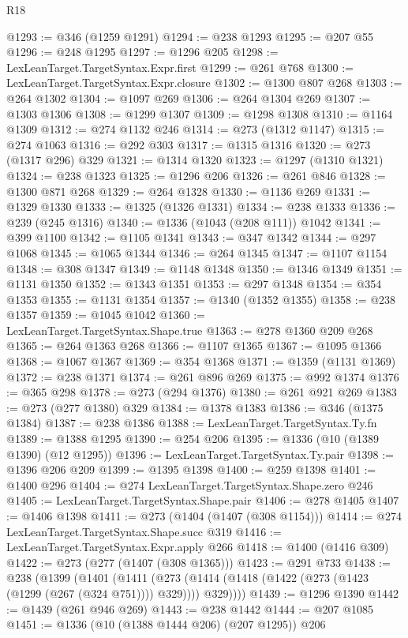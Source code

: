 \begin{lexlean}{R18}
\begin{coremodule}
{{{{{{{{{{{{{{{{{{{{{{{{{{{{{{{{{{{{{{{{{{{{{{{{{{{{{{{{{{{{{{{{{{{{{{{{{{{{{{{{{{{{{{{{{{{{{{{{{{{{{{{{{{{{{{{{{{{{{{{{{{{{{{{{{{{{{{{{{{{{{{{@1293 := @346 (@1259 @1291)
@1294 := @238 @1293
@1295 := @207 @55
@1296 := @248 @1295
@1297 := @1296 @205
@1298 := LexLeanTarget.TargetSyntax.Expr.first
@1299 := @261 @768
@1300 := LexLeanTarget.TargetSyntax.Expr.closure
@1302 := @1300 @807 @268
@1303 := @264 @1302
@1304 := @1097 @269
@1306 := @264 @1304 @269
@1307 := @1303 @1306
@1308 := @1299 @1307
@1309 := @1298 @1308
@1310 := @1164 @1309
@1312 := @274 @1132 @246
@1314 := @273 (@1312 @1147)
@1315 := @274 @1063
@1316 := @292 @303
@1317 := @1315 @1316
@1320 := @273 (@1317 @296) @329
@1321 := @1314 @1320
@1323 := @1297 (@1310 @1321)
@1324 := @238 @1323
@1325 := @1296 @206
@1326 := @261 @846
@1328 := @1300 @871 @268
@1329 := @264 @1328
@1330 := @1136 @269
@1331 := @1329 @1330
@1333 := @1325 (@1326 @1331)
@1334 := @238 @1333
@1336 := @239 (@245 @1316)
@1340 := @1336 (@1043 (@208 @111)) @1042
@1341 := @399 @1100
@1342 := @1105 @1341
@1343 := @347 @1342
@1344 := @297 @1068
@1345 := @1065 @1344
@1346 := @264 @1345
@1347 := @1107 @1154
@1348 := @308 @1347
@1349 := @1148 @1348
@1350 := @1346 @1349
@1351 := @1131 @1350
@1352 := @1343 @1351
@1353 := @297 @1348
@1354 := @354 @1353
@1355 := @1131 @1354
@1357 := @1340 (@1352 @1355)
@1358 := @238 @1357
@1359 := @1045 @1042
@1360 := LexLeanTarget.TargetSyntax.Shape.true
@1363 := @278 @1360 @209 @268
@1365 := @264 @1363 @268
@1366 := @1107 @1365
@1367 := @1095 @1366
@1368 := @1067 @1367
@1369 := @354 @1368
@1371 := @1359 (@1131 @1369)
@1372 := @238 @1371
@1374 := @261 @896 @269
@1375 := @992 @1374
@1376 := @365 @298
@1378 := @273 (@294 @1376)
@1380 := @261 @921 @269
@1383 := @273 (@277 @1380) @329
@1384 := @1378 @1383
@1386 := @346 (@1375 @1384)
@1387 := @238 @1386
@1388 := LexLeanTarget.TargetSyntax.Ty.fn
@1389 := @1388 @1295
@1390 := @254 @206
@1395 := @1336 (@10 (@1389 @1390) (@12 @1295))
@1396 := LexLeanTarget.TargetSyntax.Ty.pair
@1398 := @1396 @206 @209
@1399 := @1395 @1398
@1400 := @259 @1398
@1401 := @1400 @296
@1404 := @274 LexLeanTarget.TargetSyntax.Shape.zero @246
@1405 := LexLeanTarget.TargetSyntax.Shape.pair
@1406 := @278 @1405
@1407 := @1406 @1398
@1411 := @273 (@1404 (@1407 (@308 @1154)))
@1414 := @274 LexLeanTarget.TargetSyntax.Shape.succ @319
@1416 := LexLeanTarget.TargetSyntax.Expr.apply @266
@1418 := @1400 (@1416 @309)
@1422 := @273 (@277 (@1407 (@308 @1365)))
@1423 := @291 @733
@1438 := @238
    (@1399
      (@1401
        (@1411 (@273 (@1414 (@1418 (@1422 (@273 (@1423 (@1299 (@267 (@324 @751)))) @329)))) @329))))
@1439 := @1296 @1390
@1442 := @1439 (@261 @946 @269)
@1443 := @238 @1442
@1444 := @207 @1085
@1451 := @1336 (@10 (@1388 @1444 @206) (@207 @1295)) @206
}}}}}}}}}}}}}}}}}}}}}}}}}}}}}}}}}}}}}}}}}}}}}}}}}}}}}}}}}}}}}}}}}}}}}}}}}}}}}}}}}}}}}}}}}}}}}}}}}}}}}}}}}}}}}}}}}}}}}}}}}}}}}}}}}}}}}}}}}}}}}}}
\end{coremodule}
\end{lexlean}
